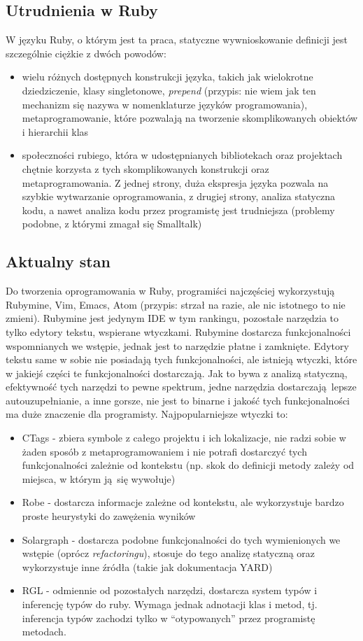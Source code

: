 \documentclass[declaration,shortabstract]{iithesis}
\begin{document}
\subsection{Utrudnienia w Ruby}

W języku Ruby, o którym jest ta praca, statyczne wywnioskowanie definicji jest szczególnie ciężkie z dwóch powodów:
\begin{itemize}
\item wielu różnych dostępnych konstrukcji języka, takich jak wielokrotne dziedziczenie, klasy singletonowe, \textit{prepend} (przypis: nie wiem jak ten mechanizm się nazywa w nomenklaturze języków programowania), metaprogramowanie, które pozwalają na tworzenie skomplikowanych obiektów i hierarchii klas
\item społeczności rubiego, która w udostępnianych bibliotekach oraz projektach chętnie korzysta z tych skomplikowanych konstrukcji oraz metaprogramowania. Z jednej strony, duża ekspresja języka pozwala na szybkie wytwarzanie oprogramowania, z drugiej strony, analiza statyczna kodu, a nawet analiza kodu przez programistę jest trudniejsza (problemy podobne, z którymi zmagał się Smalltalk)
\end{itemize}

\subsection{Aktualny stan}

Do tworzenia oprogramowania w Ruby, programiści najczęściej wykorzystują Rubymine, Vim, Emacs, Atom (przypis: strzał na razie, ale nic istotnego to nie zmieni).
Rubymine jest jedynym IDE w tym rankingu, pozostałe narzędzia to tylko edytory tekstu, wspierane wtyczkami.
Rubymine dostarcza funkcjonalności wspomnianych we wstępie, jednak jest to narzędzie płatne i zamknięte.
Edytory tekstu same w sobie nie posiadają tych funkcjonalności, ale istnieją wtyczki, które w jakiejś części te funkcjonalności dostarczają. Jak to bywa z analizą statyczną, efektywność tych narzędzi to pewne spektrum, jedne narzędzia dostarczają lepsze autouzupełnianie, a inne gorsze, nie jest to binarne i jakość tych funkcjonalności ma duże znaczenie dla programisty.
Najpopularniejsze wtyczki to:
\begin{itemize}
\item CTags - zbiera symbole z całego projektu i ich lokalizacje, nie radzi sobie w żaden sposób z metaprogramowaniem i nie potrafi dostarczyć tych funkcjonalności zależnie od kontekstu (np. skok do definicji metody zależy od miejsca, w którym ją się wywołuje)
\item Robe - dostarcza informacje zależne od kontekstu, ale wykorzystuje bardzo proste heurystyki do zawężenia wyników
\item Solargraph - dostarcza podobne funkcjonalności do tych wymienionych we wstępie (oprócz \textit{refactoringu}), stosuje do tego analizę statyczną oraz wykorzystuje inne źródła (takie jak dokumentacja YARD)
\item RGL - odmiennie od pozostałych narzędzi, dostarcza system typów i inferencję typów do ruby. Wymaga jednak adnotacji klas i metod, tj. inferencja typów zachodzi tylko w ``otypowanych'' przez programistę metodach.
\end{itemize}
\end{document}
